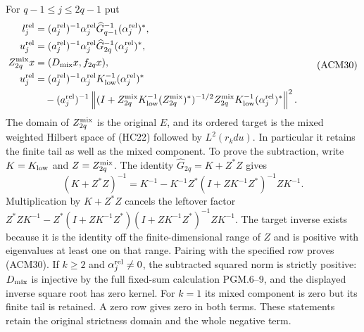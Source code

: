 For $q-1\leq j\leq2q-1$ put
\[
\begin{aligned}
 l_j^{\rm rel}
   &=(a_j^{\rm rel})^{-1}\alpha_j^{\rm rel}
             \widehat G_{q-1}^{-1}(\alpha_j^{\rm rel})^*,\\
 u_j^{\rm rel}
   &=(a_j^{\rm rel})^{-1}\alpha_j^{\rm rel}
             \widehat G_{2q}^{-1}(\alpha_j^{\rm rel})^*,\\
 Z_{2q}^{\rm mix}x&=(D_{\rm mix}x,f_{2q}x),\\
 u_j^{\rm rel}
   &=(a_j^{\rm rel})^{-1}\alpha_j^{\rm rel}
                     K_{\rm low}^{-1}(\alpha_j^{\rm rel})^*\\
   &\quad-(a_j^{\rm rel})^{-1}\left\|
 (I+Z_{2q}^{\rm mix}K_{\rm low}^{-1}(Z_{2q}^{\rm mix})^*)^{-1/2}
 Z_{2q}^{\rm mix}K_{\rm low}^{-1}(\alpha_j^{\rm rel})^*
                                      \right\|^2.
\end{aligned}\tag{ACM30}
\]
The domain of $Z_{2q}^{\rm mix}$ is the original $E$, and its
ordered target is the mixed weighted Hilbert space of (HC22)
followed by $L^2(r_kdu)$. In particular it retains the finite
tail as well as the mixed component. To prove the subtraction,
write $K=K_{\rm low}$ and $Z=Z_{2q}^{\rm mix}$. The identity
$\widehat G_{2q}=K+Z^*Z$ gives
\[
 (K+Z^*Z)^{-1}
 =K^{-1}-K^{-1}Z^*(I+ZK^{-1}Z^*)^{-1}ZK^{-1}.
\]
Multiplication by $K+Z^*Z$ cancels the leftover factor
$Z^*ZK^{-1}-Z^*(I+ZK^{-1}Z^*)(I+ZK^{-1}Z^*)^{-1}ZK^{-1}$.
The target inverse exists because it is the identity off the
finite-dimensional range of $Z$ and is positive with eigenvalues
at least one on that range. Pairing with the specified row proves
(ACM30). If $k\geq2$ and $\alpha_j^{\rm rel}\ne0$, the
subtracted squared norm is strictly positive: $D_{\rm mix}$ is
injective by the full fixed-sum calculation PGM.6--9, and the
displayed inverse square root has zero kernel. For $k=1$ its
mixed component is zero but its finite tail is retained. A zero
row gives zero in both terms. These statements retain the original
strictness domain and the whole negative term.

